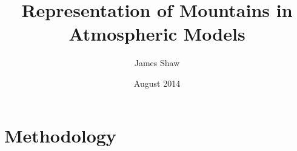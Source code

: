 \documentclass[a4paper,twoside\classopts]{memoir}
\title{Representation of Mountains in Atmospheric Models}
\author{James Shaw}
\date{August 2014}
\begin{document}
\newcommand{\TODO}[1]{\textcolor{purple}{TODO: \emph{#1}}}
\newcommand{\TODOsidenote}[1]{\marginpar{\footnotesize{\TODO{#1}}\vspace{0.3em}}}



\frontmatter
\thispagestyle{plain}
\null\vfil
\begin{abstract}
\blindtext
\end{abstract}
\vfil

\cleardoublepage
\tableofcontents*

\mainmatter

\chapter{Methodology}



\backmatter
\printbibliography
\end{document}
